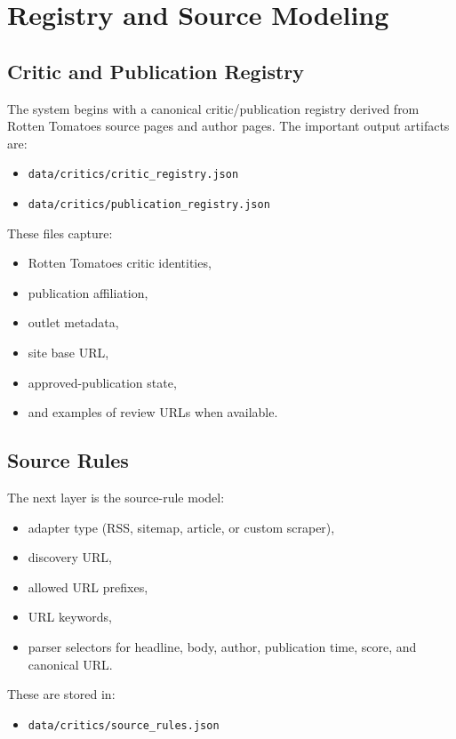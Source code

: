 \documentclass[11pt]{article}
\begin{document}
\section{Registry and Source Modeling}
\subsection{Critic and Publication Registry}
The system begins with a canonical critic/publication registry derived from Rotten Tomatoes source pages and author pages. The important output artifacts are:
\begin{itemize}[leftmargin=1.5em]
    \item \texttt{data/critics/critic\_registry.json}
    \item \texttt{data/critics/publication\_registry.json}
\end{itemize}

These files capture:
\begin{itemize}[leftmargin=1.5em]
    \item Rotten Tomatoes critic identities,
    \item publication affiliation,
    \item outlet metadata,
    \item site base URL,
    \item approved-publication state,
    \item and examples of review URLs when available.
\end{itemize}

\subsection{Source Rules}
The next layer is the source-rule model:
\begin{itemize}[leftmargin=1.5em]
    \item adapter type (RSS, sitemap, article, or custom scraper),
    \item discovery URL,
    \item allowed URL prefixes,
    \item URL keywords,
    \item parser selectors for headline, body, author, publication time, score, and canonical URL.
\end{itemize}

These are stored in:
\begin{itemize}[leftmargin=1.5em]
    \item \texttt{data/critics/source\_rules.json}
\end{itemize}
\end{document}
